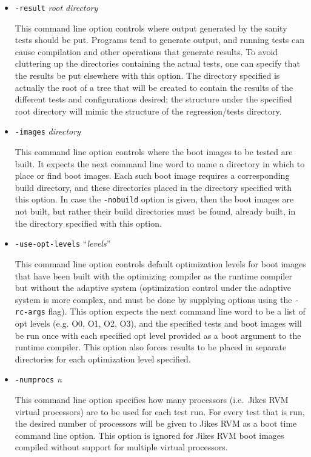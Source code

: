 \begin{itemize}
\item{\tt{-result}} {\em root directory}

 This command line option controls where output generated by the
sanity tests should be put.  Programs tend to generate output, and
running tests can cause compilation and other operations that generate
results.  To avoid cluttering up the directories containing the actual
tests, one can specify that the results be put elsewhere with this
option.  The directory specified is actually the root of a tree that
will be created to contain the results of the different tests and
configurations desired; the structure under the specified root
directory will mimic the structure of the regression/tests directory. 

\item{\tt{-images}} {\em directory}

 This command line option controls where the boot images to be tested
are built. It expects the next command line word to name a directory
in which to place or find boot images. Each such boot image requires a
corresponding build directory, and these directories placed in the
directory specified with this option.  In case the {\tt -nobuild}
option is given, then the boot images are not built, but rather their
build directories must be found, already built, in the directory
specified with this option.

\item{\tt{-use-opt-levels}} ``{\em levels}''

 This command line option controls default optimization levels for
boot images that have been built with the optimizing compiler as the
runtime compiler but without the adaptive system (optimization control
under the adaptive system is more complex, and must be done by
supplying options using the {\tt -rc-args} flag).  This option expects
the next command line word to be a list of opt levels (e.g. O0, O1,
O2, O3), and the specified tests and boot images will be run once with
each specified opt level provided as a boot argument to the runtime
compiler.  This option also forces results to be placed in separate
directories for each optimization level specified.

\item{\tt{-numprocs}} {\em n}

 This command line option specifies how many processors (i.e.\ Jikes\TMweb{}
RVM virtual processors) are to be used for each test run.  For every
test that is run, the desired number of processors will be given to
Jikes RVM as a boot time command line option.  This option is ignored
for Jikes RVM boot images compiled without support for multiple
virtual processors.


\end{itemize}

